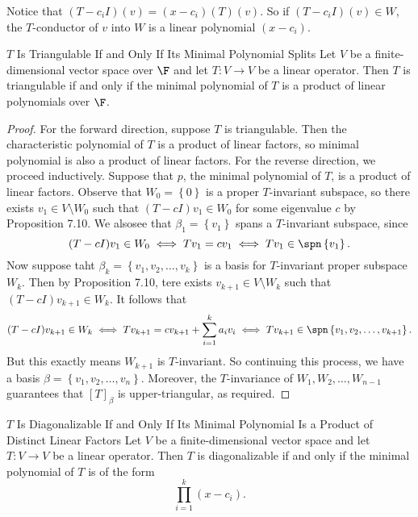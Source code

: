 \documentclass[linearalgebra]{subfiles}
\begin{document}
    \begin{remark}
        Notice that $(T-c_iI)(v) = (x-c_i)(T)(v)$. So if $(T-c_iI)(v)\in W$, the $T$-conductor of $v$ into $W$ is a linear polynomial $(x-c_i)$.
    \end{remark}

    \begin{theorem}{$T$ Is Triangulable If and Only If Its Minimal Polynomial Splits}
        Let $V$ be a finite-dimensional vector space over $\F$ and let $T:V\to V$ be a linear operator. Then $T$ is triangulable if and only if the minimal polynomial of $T$ is a product of linear polynomials over $\F$.
    \end{theorem}

    \begin{proof}
        For the forward direction, suppose $T$ is triangulable. Then the characteristic polynomial of $T$ is a product of linear factors, so minimal polynomial is also a product of linear factors. For the reverse direction, we proceed inductively. Suppose that $p$, the minimal polynomial of $T$, is a product of linear factors. Observe that $W_0 = \left\lbrace 0 \right\rbrace$ is a proper $T$-invariant subspace, so there exists $v_1\in V\setminus W_0$ such that $(T-cI)v_1\in W_0$ for some eigenvalue $c$ by Proposition 7.10. We alsosee that $\beta_1 = \left\lbrace v_1 \right\rbrace$ spans a $T$-invariant subspace, since
        \begin{equation*}
            (T-cI)v_1\in W_0 \iff Tv_1 = cv_1 \iff Tv_1\in \spn \left\lbrace v_1 \right\rbrace.
        \end{equation*}
        Now suppose taht $\beta_k = \left\lbrace v_1, v_2, \ldots, v_k \right\rbrace$ is a basis for $T$-invariant proper subspace $W_k$. Then by Proposition 7.10, tere exists $v_{k+1}\in V\setminus W_k$ such that $(T-cI)v_{k+1}\in W_k$. It follows that
        \begin{equation*}
            (T-cI)v_{k+1}\in W_k \iff Tv_{k+1} = cv_{k+1} + \sum^{k}_{i=1} a_iv_i  \iff Tv_{k+1}\in \spn \left\lbrace v_1, v_2, \ldots, v_{k+1} \right\rbrace.
        \end{equation*}
        But this exactly means $W_{k+1}$ is $T$-invariant. So continuing this process, we have a basis $\beta = \left\lbrace v_1, v_2, \ldots, v_n \right\rbrace$. Moreover, the $T$-invariance of $W_1, W_2, \ldots, W_{n-1}$ guarantees that $[T]_\beta$ is upper-triangular, as required.
    \end{proof}

    \clearpage
    \begin{theorem}{$T$ Is Diagonalizable If and Only If Its Minimal Polynomial Is a Product of Distinct Linear Factors}
        Let $V$ be a finite-dimensional vector space and let $T:V\to V$ be a linear operator. Then $T$ is diagonalizable if and only if the minimal polynomial of $T$ is of the form
        \begin{equation*}
            \prod^{k}_{i=1} (x-c_i).
        \end{equation*}
    \end{theorem}
\end{document}
